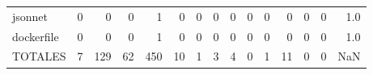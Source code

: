 \begin{tabular}{lrrrrrrrrrrrrrr}
jsonnet          &        0 &       0 &          0 &               1 &                0 &       0 &          0 &          0 &         0 &         0 &      0 &             0 &         0 &      1.0 \\
dockerfile       &        0 &       0 &          0 &               1 &                0 &       0 &          0 &          0 &         0 &         0 &      0 &             0 &         0 &      1.0 \\
TOTALES          &        7 &     129 &         62 &             450 &               10 &       1 &          3 &          4 &         0 &         1 &     11 &             0 &         0 &      NaN \\
\bottomrule
\end{tabular}
